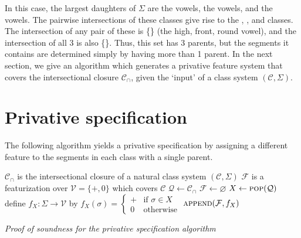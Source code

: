 \documentclass[11pt, oneside]{article}   	%
\begin{document}
In this case, the largest daughters of $\Sigma$ are the  vowels, the  vowels, and the  vowels. The pairwise intersections of these classes give rise to the , , and  classes. The intersection of any pair of these is \{\} (the high, front, round vowel), and the intersection of all 3 is also \{\}. Thus, this set has 3 parents, but the segments it contains are determined simply by having more than 1 parent. In the next section, we give an algorithm which generates a privative feature system that covers the intersectional closure $\mathcal C_\cap$, given the `input' of a class system $(\mathcal C, \Sigma)$.

 \section{Privative specification}

The following algorithm yields a privative specification by assigning a different feature  to the segments in each class with a single parent.
 
\noindent \begin{algorithmic}
    \REQUIRE $\mathcal C_\cap$ is the intersectional closure of a natural class system $(\mathcal C, \Sigma)$
    \ENSURE $\mathcal F$ is a featurization over $\mathcal V = \{ +, 0 \}$ which covers $\mathcal C$
    \STATE
    \STATE $\mathcal Q \leftarrow \mathcal C_\cap$
    \STATE $\mathcal F \leftarrow \varnothing$
    \STATE
        \STATE $X \leftarrow \textsc{pop}(\mathcal Q)$
            \STATE define $f_X : \Sigma \rightarrow \mathcal V$ by $f_X(\sigma) = \begin{cases}
                + & \mbox{if } \sigma \in X \\
                0 & \mbox{otherwise}
                \end{cases} $
            \STATE $\textsc{append}(\mathcal F, f_X)$
        \ENDIF
    \ENDWHILE
\end{algorithmic}

\vspace{\baselineskip} \noindent \textit{Proof of soundness for the privative specification algorithm}
\end{document}
